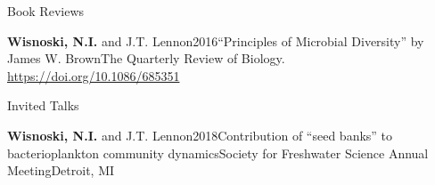 \documentclass{resume} %
\begin{document}
\begin{rhangSection}{Book Reviews}

\begin{Publication}{{\bf Wisnoski, N.I.} and J.T. Lennon}{2016}{\enquote{Principles of Microbial Diversity} by James W. Brown}{The Quarterly Review of Biology. \url{https://doi.org/10.1086/685351}}
\end{Publication}

\end{rhangSection}

\bigskip

\begin{rhangSection}{Invited Talks}

  \begin{Presentation}{{\bf Wisnoski, N.I.} and J.T. Lennon}{2018}{Contribution of \enquote{seed banks} to bacterioplankton community dynamics}{Society for Freshwater Science Annual Meeting}{Detroit, MI}
  \end{Presentation}

\end{rhangSection}

\bigskip
\end{document}
